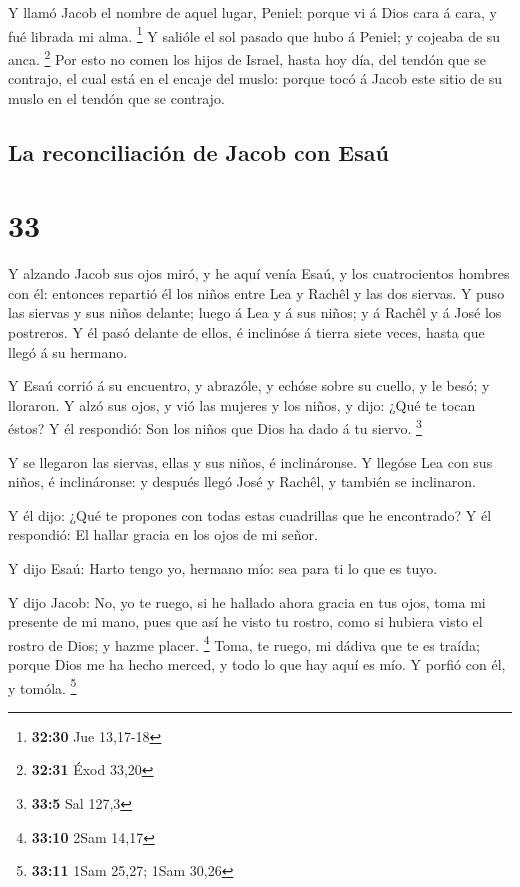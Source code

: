  Y llamó Jacob el nombre de aquel lugar, Peniel: porque
vi á Dios cara á cara, y fué librada mi alma. \footnote{\textbf{32:30}
  Jue 13,17-18}  Y salióle el sol pasado que hubo á
Peniel; y cojeaba de su anca. \footnote{\textbf{32:31} Éxod 33,20}
 Por esto no comen los hijos de Israel, hasta hoy día,
del tendón que se contrajo, el cual está en el encaje del muslo: porque
tocó á Jacob este sitio de su muslo en el tendón que se contrajo.

\hypertarget{la-reconciliaciuxf3n-de-jacob-con-esauxfa}{%
\subsection{La reconciliación de Jacob con
Esaú}\label{la-reconciliaciuxf3n-de-jacob-con-esauxfa}}

\hypertarget{section-32}{%
\section{33}\label{section-32}}

 Y alzando Jacob sus ojos miró, y he aquí venía Esaú, y
los cuatrocientos hombres con él: entonces repartió él los niños entre
Lea y Rachêl y las dos siervas.  Y puso las siervas y sus
niños delante; luego á Lea y á sus niños; y á Rachêl y á José los
postreros.  Y él pasó delante de ellos, é inclinóse á
tierra siete veces, hasta que llegó á su hermano.

 Y Esaú corrió á su encuentro, y abrazóle, y echóse sobre
su cuello, y le besó; y lloraron.  Y alzó sus ojos, y vió
las mujeres y los niños, y dijo: ¿Qué te tocan éstos? Y él respondió:
Son los niños que Dios ha dado á tu siervo. \footnote{\textbf{33:5} Sal
  127,3}

 Y se llegaron las siervas, ellas y sus niños, é
inclináronse.  Y llegóse Lea con sus niños, é
inclináronse: y después llegó José y Rachêl, y también se inclinaron.

 Y él dijo: ¿Qué te propones con todas estas cuadrillas
que he encontrado? Y él respondió: El hallar gracia en los ojos de mi
señor.

 Y dijo Esaú: Harto tengo yo, hermano mío: sea para ti lo
que es tuyo.

 Y dijo Jacob: No, yo te ruego, si he hallado ahora
gracia en tus ojos, toma mi presente de mi mano, pues que así he visto
tu rostro, como si hubiera visto el rostro de Dios; y hazme placer.
\footnote{\textbf{33:10} 2Sam 14,17}  Toma, te ruego, mi
dádiva que te es traída; porque Dios me ha hecho merced, y todo lo que
hay aquí es mío. Y porfió con él, y tomóla. \footnote{\textbf{33:11}
  1Sam 25,27; 1Sam 30,26}

